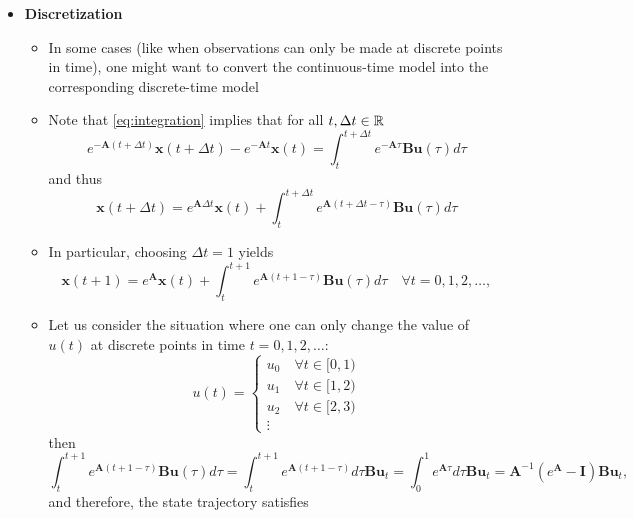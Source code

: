 \documentclass[12pt,a4paper]{article}
\begin{document}
\begin{itemize}
\item \textbf{Discretization}
  \begin{itemize}
  \item In some cases (like when observations can only be made at discrete points in time),
    one might want to convert the continuous-time model into the corresponding discrete-time model
  \item Note that \eqref{eq:integration} implies
    that for all $t, \Delta t\in \mathbb{R}$
    \begin{equation}\nonumber%
      e^{-\bm{A}(t+\Delta t)}\bm{x}(t+\Delta t) - e^{-\bm{A}t}\bm{x}(t)
      = \int_{t}^{t+\Delta t}e^{-\bm{A}\tau}\bm{B}\bm{u}(\tau)d\tau
    \end{equation}
    and thus
    \begin{equation}\label{eq:trajectory_deltat}%
      \bm{x}(t+\Delta t)
      = e^{\bm{A}\Delta t}\bm{x}(t)
      + \int_{t}^{t+\Delta t}e^{\bm{A}(t+\Delta t -\tau)}\bm{B}\bm{u}(\tau)d\tau
    \end{equation}
  \item In particular, choosing $\Delta t = 1$ yields
    \begin{equation}\label{eq:trajectory_discrete0}%
      \bm{x}(t+1)
      = e^{\bm{A}}\bm{x}(t)
      + \int_{t}^{t+1}e^{\bm{A}(t+1-\tau)}\bm{B}\bm{u}(\tau)d\tau
      \quad \forall t = 0, 1, 2, \ldots,
    \end{equation}
  \item Let us consider the situation where one can only change the value of $u(t)$ at discrete points in time $t=0, 1, 2, \ldots$:
    \begin{equation}\nonumber%
      u(t) =
      \begin{cases}
      u_{0} \quad \forall t \in [0, 1) \\
      u_{1} \quad \forall t \in [1, 2) \\
      u_{2} \quad \forall t \in [2, 3) \\
      \vdots
      \end{cases}
    \end{equation}
    then
    \begin{equation}\nonumber%
      \int_{t}^{t+1}e^{\bm{A}(t+1-\tau)}\bm{B}\bm{u}(\tau)d\tau
      = 
      \int_{t}^{t+1}e^{\bm{A}(t+1-\tau)}d\tau\bm{B}\bm{u}_{t}
      = 
      \int_{0}^{1}e^{\bm{A}\tau}d\tau\bm{B}\bm{u}_{t}
      = 
      \bm{A}^{-1}(e^{\bm{A}}-\bm{I})\bm{B}\bm{u}_{t},
    \end{equation}
    and therefore,
    the state trajectory satisfies

\end{itemize}
\end{itemize}
\end{document}
